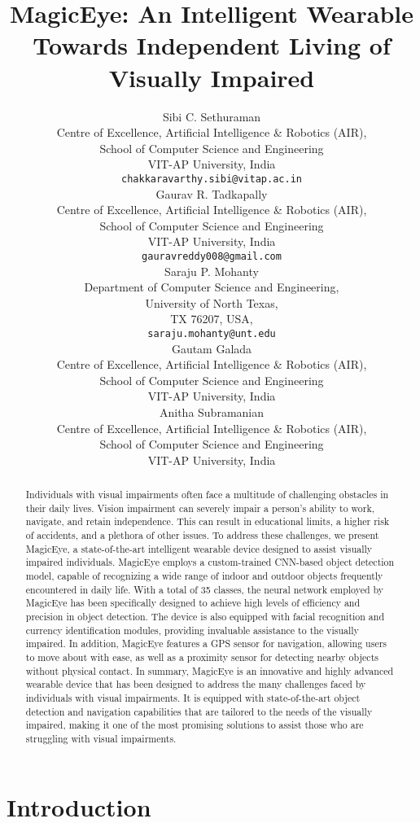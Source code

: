 \documentclass[journal,12pt,onecolumn,letterpaper]{IEEEtran}
\title{MagicEye: An Intelligent Wearable Towards Independent Living of Visually Impaired}
\author{
 Sibi C. Sethuraman\\
  Centre of Excellence, Artificial Intelligence \& Robotics (AIR),\\
  School of Computer Science and Engineering\\
  VIT-AP University, India \\
  \texttt{chakkaravarthy.sibi@vitap.ac.in} \\
   \And
Gaurav R. Tadkapally \\
 Centre of Excellence, Artificial Intelligence \& Robotics (AIR),\\
  School of Computer Science and Engineering\\
  VIT-AP University, India \\
  \texttt{gauravreddy008@gmail.com} \\
 \And
 Saraju P. Mohanty\\
Department of Computer Science and Engineering,\\
University of North Texas, \\
TX 76207, USA, \\
  \texttt{saraju.mohanty@unt.edu}\\
 \And
  Gautam Galada \\
  Centre of Excellence, Artificial Intelligence \& Robotics (AIR),\\
  School of Computer Science and Engineering\\
  VIT-AP University, India \\
   \And
  Anitha Subramanian \\
  Centre of Excellence, Artificial Intelligence \& Robotics (AIR),\\
  School of Computer Science and Engineering\\
  VIT-AP University, India \\
}
\begin{document}
\maketitle


\begin{abstract}
Individuals with visual impairments often face a multitude of challenging obstacles in their daily lives. Vision impairment can severely impair a person's ability to work, navigate, and retain independence. This can result in educational limits, a higher risk of accidents, and a plethora of other issues. To address these challenges, we present MagicEye, a state-of-the-art intelligent wearable device designed to assist visually impaired individuals. MagicEye employs a custom-trained CNN-based object detection model, capable of recognizing a wide range of indoor and outdoor objects frequently encountered in daily life. With a total of 35 classes, the neural network employed by MagicEye has been specifically designed to achieve high levels of efficiency and precision in object detection. The device is also equipped with facial recognition and currency identification modules, providing invaluable assistance to the visually impaired.  In addition, MagicEye features a GPS sensor for navigation, allowing users to move about with ease, as well as a proximity sensor for detecting nearby objects without physical contact. In summary, MagicEye is an innovative and highly advanced wearable device that has been designed to address the many challenges faced by individuals with visual impairments. It is equipped with state-of-the-art object detection and navigation capabilities that are tailored to the needs of the visually impaired, making it one of the most promising solutions to assist those who are struggling with visual impairments.

\end{abstract}




\section{Introduction}
\label{Sec:Introduction}
\end{document}
